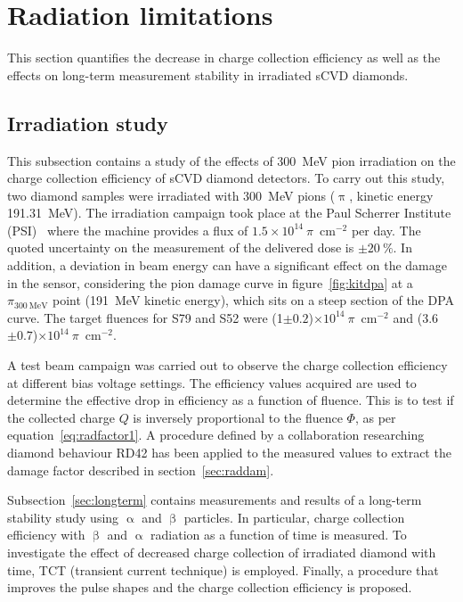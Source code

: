 \clearpage
\section{Radiation limitations}
\label{sec:radlimit}
This section quantifies the decrease in charge collection efficiency as well as the effects on long-term measurement stability in irradiated sCVD diamonds.


\subsection{Irradiation study}
This subsection contains a study of the effects of 300~MeV pion irradiation on the charge collection efficiency of sCVD diamond detectors. To carry out this study, two diamond samples were irradiated with 300~MeV pions ($\uppi$, kinetic energy 191.31~MeV). The irradiation campaign took place at the Paul Scherrer Institute (PSI)~\cite{PSI:00000} where the machine provides a flux of $1.5\times10^{14}~\pi$~cm$^{-2}$ per day. The quoted uncertainty on the measurement of the delivered dose is $\pm20~\%$. In addition, a deviation in beam energy can have a significant effect on the damage in the sensor, considering the pion damage curve in figure~\ref{fig:kitdpa} at a $\pi_{\mathrm{300~MeV}}$ point (191~MeV kinetic energy), which sits on a steep section of the DPA curve. The target fluences for S79 and S52 were  (1$\pm0.2$)$\times10^{14}~\pi$~cm$^{-2}$ and (3.6$\pm0.7$)$\times10^{14}~\pi$~cm$^{-2}$.

A test beam campaign was carried out to observe the charge collection efficiency at different bias voltage settings. The efficiency values acquired are used to determine the effective drop in efficiency as a function of fluence. This is to test if the collected charge $Q$ is inversely proportional to the fluence $\Phi$, as per equation~\ref{eq:radfactor1}. A procedure defined by a collaboration researching diamond behaviour RD42 has been applied to the measured values to extract the damage factor described in section~\ref{sec:raddam}.

Subsection~\ref{sec:longterm} contains measurements and results of a long-term stability study using $\upalpha$ and $\upbeta$ particles. In particular, charge collection efficiency with $\upbeta$ and $\upalpha$ radiation as a function of time is measured. To investigate the effect of decreased charge collection of irradiated diamond with time, TCT (transient current technique) is employed. Finally, a procedure that improves the pulse shapes and the charge collection efficiency is proposed.



